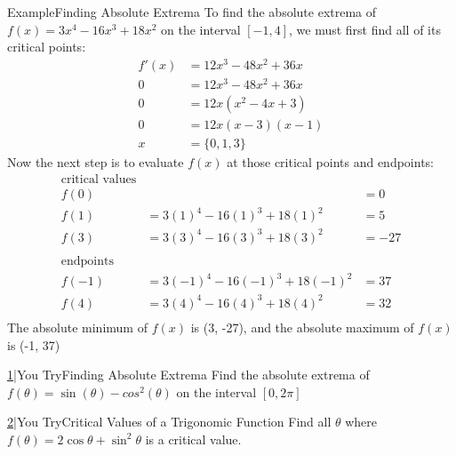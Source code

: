 \documentclass{MathNotes}
\newenvironment{example}[1]{\begin{BlueBox}{Example}{#1}}{\end{BlueBox}}
\newenvironment{practice}[2]{\begin{PurpleBox}{\texorpdfstring{#1}\Big|You Try}{#2}}{\end{PurpleBox}}
\begin{document}
\begin{example}{Finding Absolute Extrema}
	To find the absolute extrema of $f(x)=3x^4-16x^3+18x^2$ on the interval
	$[-1, 4]$, we must first find all of its critical points:
	\begin{align*}
		f'(x) & =12x^3-48x^2+36x \\
		0     & =12x^3-48x^2+36x \\
		0     & =12x(x^2-4x+3)   \\
		0     & =12x(x-3)(x-1)   \\
		x     & =\{0, 1, 3\}
	\end{align*}
	Now the next step is to evaluate $f(x)$ at those critical points and
	endpoints:
	\begin{align*}
		\text{critical values}                    \\
		f(0)  &                            & =0   \\
		f(1)  & =3(1)^4-16(1)^3+18(1)^2    & =5   \\
		f(3)  & =3(3)^4-16(3)^3+18(3)^2    & =-27 \\
		\\
		\text{endpoints}                          \\
		f(-1) & =3(-1)^4-16(-1)^3+18(-1)^2 & =37  \\
		f(4)  & =3(4)^4-16(4)^3+18(4)^2    & =32  \\
	\end{align*}
	The absolute minimum of $f(x)$ is (3, -27), and the absolute maximum of
	$f(x)$ is (-1, 37)
\end{example}

\begin{multicols}{2}
	\begin{practice}{\hyperref[ans:3.1-1]{1}}{Finding Absolute Extrema}
		\label{prac:3.1-1}
		Find the absolute extrema of $f(\theta)=\sin(\theta)-cos^2(\theta)$ on
		the interval $[0, 2\pi]$
	\end{practice}
	\begin{practice}{\hyperref[ans:3.1-2]{2}}{Critical Values of a Trigonomic Function}
		\label{prac:3.1-2}
		Find all $\theta$ where $\displaystyle f(\theta)=2\cos\theta+\sin^2\theta$
		is a critical value.
	\end{practice}
\end{multicols}

\newpage
\end{document}
